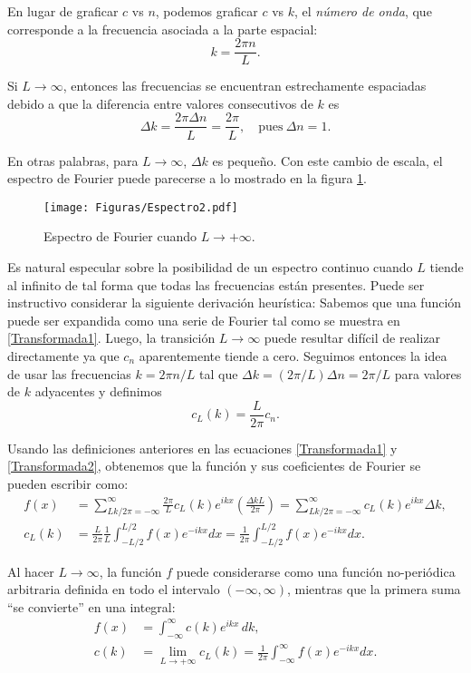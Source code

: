 En lugar de graficar $c$ vs $n$, podemos graficar $c$ vs $k$, el \emph{número de onda}, que corresponde a la frecuencia asociada a la parte espacial:
$$k = \frac{2\pi n}{L}.$$

Si $L \to \infty$, entonces las frecuencias se encuentran estrechamente espaciadas debido a que la diferencia entre valores consecutivos de $k$ es
$$\Delta k = \frac{ 2\pi \Delta n}{L}  = \frac{2\pi}{L}, \quad \mbox{pues}~ \Delta n = 1.$$

En otras palabras, para $L \to \infty$, $\Delta k$ es pequeño. Con este cambio de escala, el espectro de Fourier puede parecerse a lo mostrado en la figura \ref{Espectro1}.

\begin{figure}
    \centering
    \texttt{[image: Figuras/Espectro2.pdf]}
    \caption{Espectro de Fourier cuando $L \to + \infty$.}
    \label{Espectro1}
\end{figure}

Es natural especular sobre la posibilidad de un espectro continuo cuando $L$ tiende al infinito  de tal forma que todas las frecuencias están presentes. Puede ser instructivo considerar la siguiente derivación heurística: Sabemos que una función puede ser expandida como una serie de Fourier tal como se muestra en \eqref{Transformada1}. Luego, la transición $L \to \infty$ puede resultar difícil de realizar directamente ya que $c_n$ aparentemente tiende a cero. Seguimos entonces la idea de usar las frecuencias $k = 2\pi n/L$ tal que
$\Delta k = (2\pi/L ) \Delta n = 2\pi/L$ para valores de $k$ adyacentes y definimos
$$c_L(k) = \frac{L}{2 \pi} c_n.$$

Usando las definiciones anteriores en las ecuaciones \eqref{Transformada1} y \eqref{Transformada2}, obtenemos que la función y sus coeficientes de Fourier se pueden escribir como: 
\begin{align*}
    f(x)&= \sum_{Lk/2\pi = -\infty}^{\infty} \frac{2\pi}{L} c_L(k) e^{ikx} \left( \frac{\Delta k L}{2\pi}\right) = \sum_{Lk/2\pi = -\infty}^{\infty}  c_L(k) e^{ikx} \Delta k , \\
  c_L(k) &= \frac{L}{2\pi} \frac{1}{L} \int_{-L/2}^{L/2} f(x) e^{-ikx} dx = \frac{1}{2\pi} \int_{-L/2}^{L/2} f(x) e^{-ikx} dx.
\end{align*}

Al hacer $L \to \infty$, la función $f$ puede considerarse como una función no-periódica arbitraria definida en todo el intervalo $(-\infty, \infty)$, mientras que la primera suma ``se convierte'' en una integral:
\begin{align*}
    f(x)&= \int_{-\infty}^{\infty} c(k) e^{ikx} \,dk, \\
  c(k) &= \lim_{L\to + \infty} c_L(k) =  \frac{1}{2\pi}  \int_{-\infty}^{\infty} f(x) e^{-ikx} dx.
\end{align*}


